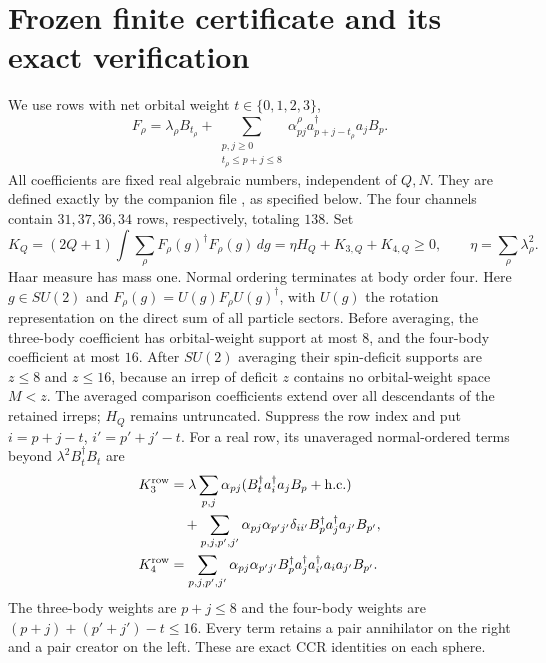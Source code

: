 \documentclass[11pt]{article}
\begin{document}
\section{Frozen finite certificate and its exact verification}
We use rows with net orbital weight $t\in\{0,1,2,3\}$,
\begin{equation}\label{eq:rows}
 F_\rho=\lambda_\rho B_{t_\rho}
 +\sum_{\substack{p,j\ge0\\t_\rho\le p+j\le8}}
 \alpha^\rho_{pj}a_{p+j-t_\rho}^\dagger a_jB_p.
\end{equation}
All coefficients are fixed real algebraic numbers, independent of $Q,N$.
They are defined exactly by the companion file
, as specified below. The four
channels contain $31,37,36,34$ rows, respectively, totaling $138$.
Set
\begin{equation}
 K_Q=(2Q+1)\int\sum_\rho F_\rho(g)^\dagger F_\rho(g)\,dg
 =\eta H_Q+K_{3,Q}+K_{4,Q}\ge0,\qquad
 \eta=\sum_\rho\lambda_\rho^2.
\end{equation}
Haar measure has mass one. Normal ordering terminates at body order four.
Here $g\in SU(2)$ and $F_\rho(g)=U(g)F_\rho U(g)^\dagger$, with $U(g)$
the rotation representation on the direct sum of all particle sectors.
Before averaging, the three-body coefficient has orbital-weight support at
most $8$, and the four-body coefficient at most $16$. After $SU(2)$
averaging their spin-deficit supports are $z\le8$ and $z\le16$, because
an irrep of deficit $z$ contains no orbital-weight space $M<z$.
The averaged comparison coefficients extend over all descendants of the retained
irreps; $H_Q$ remains untruncated.
Suppress the row index and put $i=p+j-t$, $i'=p'+j'-t$. For a real row, its unaveraged
normal-ordered terms beyond $\lambda^2B_t^\dagger B_t$ are
\begin{align}
 K_3^{\rm row}
 &=\lambda\sum_{p,j}\alpha_{pj}
    (B_t^\dagger a_i^\dagger a_jB_p+\mathrm{h.c.})\notag\\
 &\quad+\sum_{p,j,p',j'}\alpha_{pj}\alpha_{p'j'}\delta_{ii'}
     B_p^\dagger a_j^\dagger a_{j'}B_{p'},\notag\\
 K_4^{\rm row}
 &=\sum_{p,j,p',j'}\alpha_{pj}\alpha_{p'j'}
     B_p^\dagger a_j^\dagger a_{i'}^\dagger a_i a_{j'}B_{p'}.
 \label{eq:normal-rows-audit}
\end{align}
The three-body weights are $p+j\le8$ and the four-body weights are
$(p+j)+(p'+j')-t\le16$. Every term retains a pair annihilator on the right
and a pair creator on the left. These are exact CCR identities on each sphere.
\end{document}
